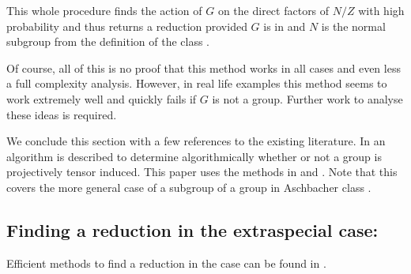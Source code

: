 This whole procedure finds the action of $G$ on the direct factors of $N/Z$
with high probability and thus returns a reduction provided $G$ is in 
and $N$ is the normal subgroup from the definition of the class .

Of course, all of this is no proof that this method works in all cases and
even less a full complexity analysis. However, in real life examples this
method seems to work extremely well and quickly fails if $G$ is not a  group.
Further work to analyse these ideas is required.

\smallskip
We conclude this section with a few references to the existing
literature. In \cite{RecogTensInd} an algorithm is described to
determine algorithmically whether or not a group is projectively
tensor induced. This paper uses the methods in \cite{tensprodproj} and
\cite{LGO97}. Note that this covers the more general case of a
subgroup of a group in Aschbacher class .


\subsection{Finding a reduction in the extraspecial case: }
\label{solveC6}

Efficient methods to find a reduction in the  case can be found in
\cite{C6FindHom}.

